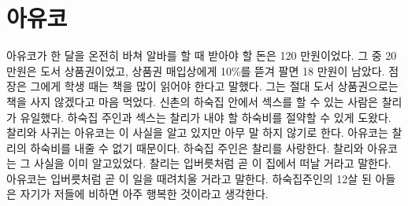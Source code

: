 \hypertarget{uxc544uxc720uxcf54}{%

\chapter{아유코}\label{uxc544uxc720uxcf54}}



아유코가 한 달을 온전히 바쳐 알바를 할 때 받아야 할 돈은 120 만원이었다. 그 중 20만원은 도서 상품권이었고, 상품권 매입상에게 10\%를 뜯겨 팔면 18 만원이 남았다. 점장은 그에게 학생 때는 책을 많이 읽어야 한다고 말했다. 그는 절대 도서 상품권으로는 책을 사지 않겠다고 마음 먹었다. 신촌의 하숙집 안에서 섹스를 할 수 있는 사람은 찰리가 유일했다. 하숙집 주인과 섹스는 찰리가 내야 할 하숙비를 절약할 수 있게 도왔다. 찰리와 사귀는 아유코는 이 사실을 알고 있지만 아무 말 하지 않기로 한다. 아유코는 찰리의 하숙비를 내줄 수 없기 때문이다. 하숙집 주인은 찰리를 사랑한다. 찰리와 아유코는 그 사실을 이미 알고있었다. 찰리는 입버릇처럼 곧 이 집에서 떠날 거라고 말한다. 아유코는 입버릇처럼 곧 이 일을 때려치울 거라고 말한다. 하숙집주인의 12살 된 아들은 자기가 저들에 비하면 아주 행복한 것이라고 생각한다.

